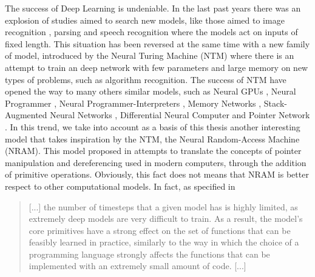 The success of Deep Learning is undeniable. In the last past years there was an explosion of studies aimed to search new models, like those aimed to image recognition \cite{Krizhevsky2012ImageNetCW}, parsing \cite{Vinyals2015GrammarAA} and speech recognition \cite{Chan2015ListenAA} where the models act on inputs of fixed length. This situation has been reversed at the same time with a new family of model, introduced by the Neural Turing Machine (NTM) \cite{Graves2014NeuralTM} where there is an attempt to train an deep network with few parameters and large memory on new types of problems, such as algorithm recognition. The success of NTM have opened the way to many others similar models, such as Neural GPUs \cite{Kaiser2015NeuralGL}, Neural Programmer \cite{Neelakantan2015NeuralPI}, Neural Programmer-Interpreters \cite{Reed2015NeuralP}, Memory Networks \cite{Weston2014MemoryN}, Stack-Augmented Neural Networks \cite{Joulin2015InferringAP}, Differential Neural Computer \cite{Graves2016HybridCU} and Pointer Network \cite{Vinyals2015PointerN}.
\newline \newline
In this trend, we take into account as a basis of this thesis another interesting model that takes inspiration by the NTM, the Neural Random-Access Machine (NRAM). This model proposed in \cite{NRAM:2016} attempts to translate the concepts of pointer manipulation and dereferencing used in modern computers, through the addition of primitive operations. Obviously, this fact does not means that NRAM is better respect to other computational models. In fact, as specified in \cite{NRAM:2016}
\begin{quote}
[...] the number of timesteps that a given model has is highly limited, as extremely deep models are very difficult to train. As a result, the model’s core primitives have a strong effect on the set of functions that can be feasibly learned in practice, similarly to the way in which the choice of a programming language strongly affects the functions that can be implemented with an extremely small amount of code. [...]
\end{quote}


